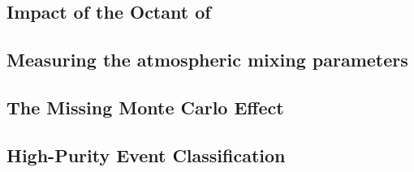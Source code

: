 \subsection{Impact of the Octant of }
\label{sec:results_octant}

\subsection{Measuring the atmospheric mixing parameters}
\label{sec:results_atmosperic}

\subsection{The Missing Monte Carlo Effect}
\label{sec:results_mcstats}

\subsection{High-Purity Event Classification}
\label{sec:results_includeunkn}